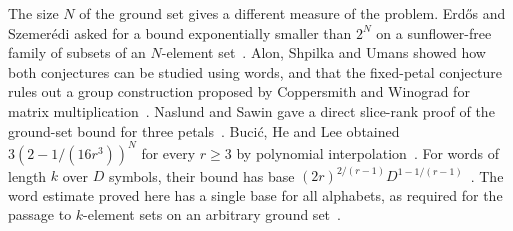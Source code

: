 The size \(N\) of the ground set gives a different measure of the
problem. Erd\H{o}s and Szemer\'edi asked for a bound exponentially
smaller than \(2^N\) on a sunflower-free family of subsets of
an \(N\)-element set~\cite{ES}. Alon, Shpilka and Umans showed how
both conjectures can be studied using words, and that the fixed-petal
conjecture rules out a group construction proposed by Coppersmith
and Winograd for matrix multiplication~\cite{ASU}. Naslund and
Sawin gave a direct slice-rank proof of the ground-set bound for
three petals~\cite{NS}. Buci\'c, He and Lee obtained
\(3(2-1/(16r^3))^N\) for every \(r\ge3\) by polynomial
interpolation~\cite[Theorem~1]{BHL}. For words of length \(k\) over
\(D\) symbols, their bound has base
\((2r)^{2/(r-1)}D^{1-1/(r-1)}\)~\cite[Theorem~2]{BHL}. The
word estimate proved here has a single base for all alphabets, as
required for the passage to \(k\)-element sets on an arbitrary ground
set~\cite[Theorem~2.6]{ASU}.
